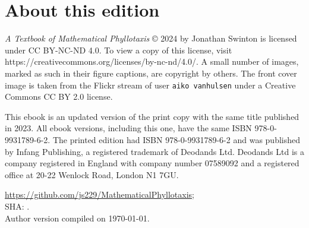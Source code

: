 
\thispagestyle{titlingpage}


\chapter*{About this edition}

\textit{A Textbook of Mathematical Phyllotaxis} © 2024 by Jonathan Swinton is licensed under  CC BY-NC-ND 4.0. To view a copy of this license, visit https://creativecommons.org/licenses/by-nc-nd/4.0/.
A small number of images, marked as such in their figure captions, are copyright by others. The front cover image is taken from the Flickr stream of user \texttt{aiko vanhulsen} under a Creative Commons CC BY 2.0 license.

This ebook is an updated version of the print copy with the same title
published in 2023. All ebook versions, including this one, have the same ISBN 978-0-9931789-6-2.
The printed edition had ISBN 978-0-9931789-6-2 and was published by Infang Publishing, a registered trademark of  Deodands Ltd. Deodands Ltd is a company registered in England with company number 07589092 and a registered office at 20-22 Wenlock Road, London N1 7GU.

\url{https://github.com/js229/MathematicalPhyllotaxis};
\\ 
SHA: \jGithubRepoSHA. 
\\
Author version \jdraftnumber{} compiled on  \today.


\newpage



